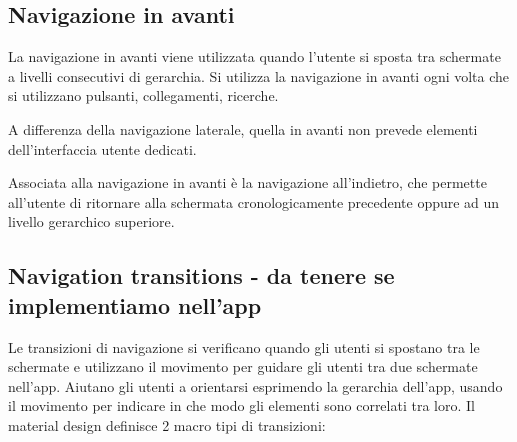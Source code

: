 \documentclass[12pt, a4paper]{report}
\begin{document}
    		\subsection{Navigazione in avanti}
    		La navigazione in avanti viene utilizzata quando l'utente si sposta tra schermate a livelli consecutivi di gerarchia. Si utilizza la navigazione in avanti ogni volta che si utilizzano pulsanti, collegamenti, ricerche.

    		A differenza della navigazione laterale, quella in avanti non prevede elementi dell'interfaccia utente dedicati.

    		Associata alla navigazione in avanti è la navigazione all'indietro, che permette all'utente di ritornare alla schermata cronologicamente precedente oppure ad un livello gerarchico superiore.


    		\subsection{Navigation transitions - da tenere se implementiamo nell'app}
    		Le transizioni di navigazione si verificano quando gli utenti si spostano tra le schermate e utilizzano il movimento per guidare gli utenti tra due schermate nell'app. Aiutano gli utenti
    		a orientarsi esprimendo la gerarchia dell'app, usando il movimento per indicare in che modo gli elementi sono correlati tra loro. Il material design definisce 2 macro tipi di transizioni:
\end{document}
